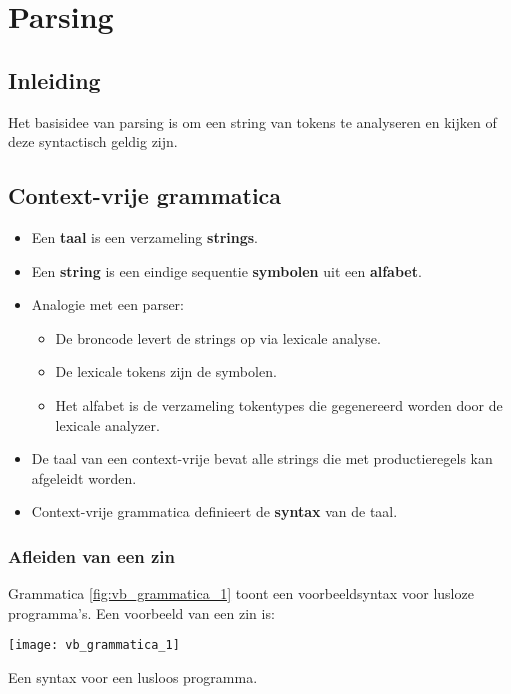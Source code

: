\chapter{Parsing}
\label{ch:parsing}

\section{Inleiding}
Het basisidee van parsing is om een string van tokens te analyseren en kijken of deze syntactisch geldig zijn.


\section{Context-vrije grammatica}
\begin{itemize}
	\item Een \textbf{taal} is een verzameling \textbf{strings}.
	\item Een \textbf{string} is een eindige sequentie \textbf{symbolen} uit een \textbf{alfabet}.
	\item Analogie met een parser:
	\begin{itemize}
		\item De broncode levert de strings op via lexicale analyse.
		\item De lexicale tokens zijn de symbolen.
		\item Het alfabet is de verzameling tokentypes die gegenereerd worden door de lexicale analyzer.
	\end{itemize}
	\item De taal van een context-vrije bevat alle strings die met productieregels kan afgeleidt worden.
	\item Context-vrije grammatica definieert de \textbf{syntax} van de taal.
\end{itemize}

\subsection{Afleiden van een zin}
Grammatica \ref{fig:vb_grammatica_1} toont een voorbeeldsyntax voor lusloze programma's. Een voorbeeld van een zin is:

\begin{grammarfigure}
	\texttt{[image: vb\_grammatica\_1]}
	\caption{Een syntax voor een lusloos programma.}
	\label{fig:vb_grammatica_1}
\end{grammarfigure}


